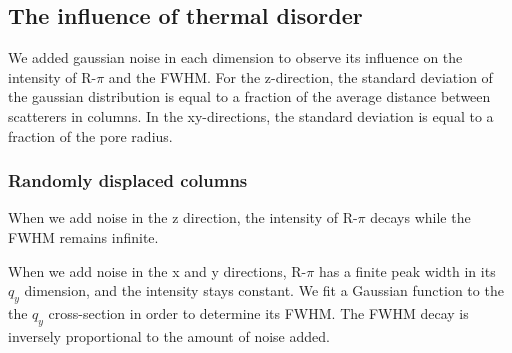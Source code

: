 \documentclass{article}
\begin{document}

  \subsection{The influence of thermal disorder}

  We added gaussian noise in each dimension to observe its influence on the intensity
  of R-$\pi$ and the FWHM. For the z-direction, the standard deviation of the 
  gaussian distribution is equal to a fraction of the average distance between scatterers
  in columns. In the xy-directions, the standard deviation is equal to a fraction 
  of the pore radius.

  \subsubsection{Randomly displaced columns}

  When we add noise in the z direction, the intensity of R-$\pi$ decays while the
  FWHM remains infinite.

  When we add noise in the x and y directions, R-$\pi$ has a finite peak width in its 
  $q_y$ dimension, and the intensity stays constant. We fit a Gaussian function to the 
  the $q_y$ cross-section in order to determine its FWHM. The FWHM decay is inversely
  proportional to the amount of noise added.  
\end{document}

